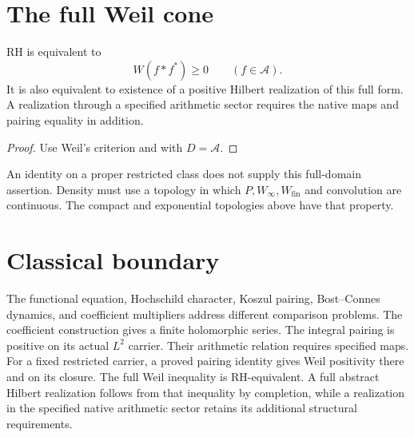 \section{The full Weil cone}
\label{v4-arith:w5-direct:irreducible-residual}
\begin{theorem}
\label{v4-arith:w5-direct:thm:irreducible-residual}
RH is equivalent to
\begin{equation}
\label{v4-arith:w5-direct:eq:irreducible}
 W(f*f^*)\ge0\qquad(f\in\mathscr A).
\end{equation}
It is also equivalent to existence of a positive Hilbert realization
of this full form. A realization through a specified arithmetic
sector requires the native maps and pairing equality in addition.
\end{theorem}
\begin{proof}
Use Weil's criterion and
 with $D=\mathscr A$.
\end{proof}
\begin{remark}
\label{v4-arith:w5-direct:rem:reduction-honesty}
An identity on a proper restricted class does not supply this
full-domain assertion. Density must use a topology in which
$P,W_\infty,W_{\mathrm{fin}}$ and convolution are continuous.
The compact and exponential topologies above have that property.
\end{remark}
\section{Classical boundary}
\label{v4-arith:w5-direct:recap}
The functional equation, Hochschild character, Koszul pairing,
Bost--Connes dynamics, and coefficient multipliers address different
comparison problems. The coefficient construction gives a finite
holomorphic series. The integral pairing is positive on its actual
$L^2$ carrier. Their arithmetic relation requires specified maps.
For a fixed restricted carrier, a proved pairing identity gives
Weil positivity there and on its closure. The full Weil inequality
is RH-equivalent. A full abstract Hilbert realization follows from
that inequality by completion, while a realization in the specified
native arithmetic sector retains its additional structural requirements.
